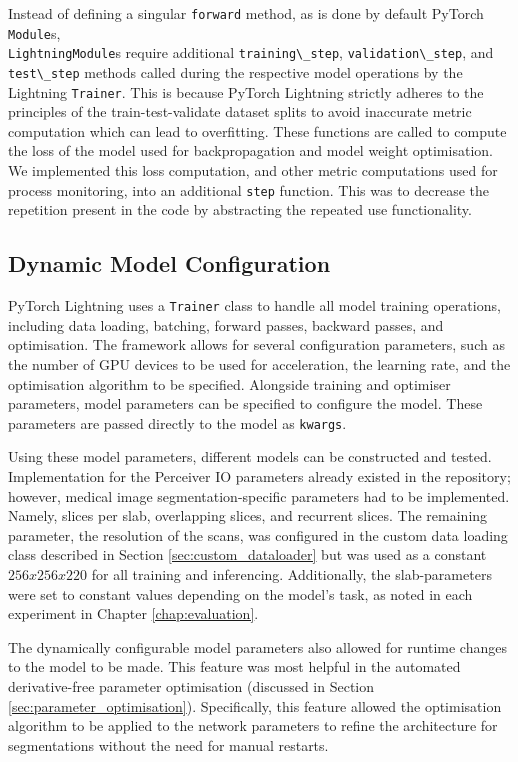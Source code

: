 \documentclass{l4proj}
\begin{document}
Instead of defining a singular \lstinline{forward} method, as is done by default PyTorch \lstinline{Module}s, \\ \lstinline{LightningModule}s require additional \lstinline{training\_step}, \lstinline{validation\_step}, and \lstinline{test\_step} methods called during the respective model operations by the Lightning \lstinline{Trainer}. This is because PyTorch Lightning strictly adheres to the principles of the train-test-validate dataset splits to avoid inaccurate metric computation which can lead to overfitting. These functions are called to compute the loss of the model used for backpropagation and model weight optimisation. We implemented this loss computation, and other metric computations used for process monitoring, into an additional \lstinline{step} function. This was to decrease the repetition present in the code by abstracting the repeated use functionality.

\subsection{Dynamic Model Configuration} \label{dynamic_configuration}

PyTorch Lightning uses a \lstinline{Trainer} class to handle all model training operations, including data loading, batching, forward passes, backward passes, and optimisation. The framework allows for several configuration parameters, such as the number of GPU devices to be used for acceleration, the learning rate, and the optimisation algorithm to be specified. Alongside training and optimiser parameters, model parameters can be specified to configure the model. These parameters are passed directly to the model as \lstinline{kwargs}.

Using these model parameters, different models can be constructed and tested. Implementation for the Perceiver IO parameters already existed in the repository; however, medical image segmentation-specific parameters had to be implemented. Namely, slices per slab, overlapping slices, and recurrent slices. The remaining parameter, the resolution of the scans, was configured in the custom data loading class described in Section \ref{sec:custom_dataloader} but was used as a constant $256x256x220$ for all training and inferencing. Additionally, the slab-parameters were set to constant values depending on the model’s task, as noted in each experiment in Chapter \ref{chap:evaluation}.

The dynamically configurable model parameters also allowed for runtime changes to the model to be made. This feature was most helpful in the automated derivative-free parameter optimisation (discussed in Section \ref{sec:parameter_optimisation}). Specifically, this feature allowed the optimisation algorithm to be applied to the network parameters to refine the architecture for segmentations without the need for manual restarts.
\end{document}
